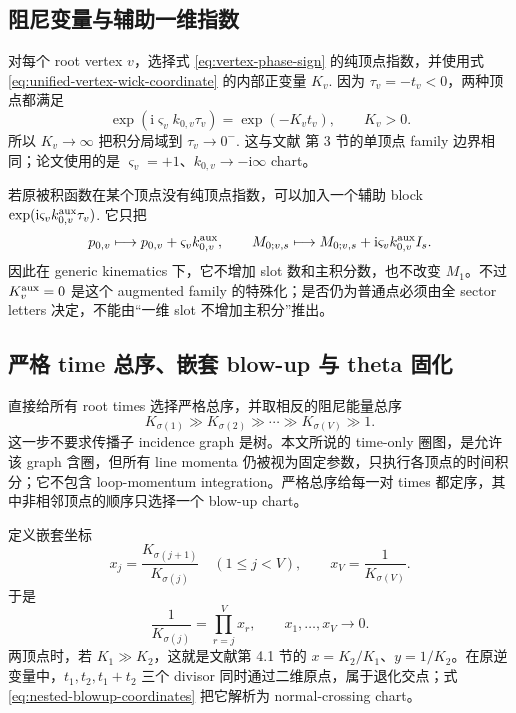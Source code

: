 \documentclass[11pt,a4paper]{ctexart}
\newcommand{\ii}{\mathrm i}
\begin{document}
\subsection{阻尼变量与辅助一维指数}

对每个 root vertex $v$，选择式 \eqref{eq:vertex-phase-sign} 的纯顶点指数，并使用式 \eqref{eq:unified-vertex-wick-coordinate} 的内部正变量 $K_v$. 因为 $\tau_v=-t_v<0$，两种顶点都满足
\begin{equation}
 \exp(\ii\varsigma_vk_{0,v}\tau_v)=\exp(-K_vt_v),
 \qquad K_v>0.
 \label{eq:wick-damping-energy}
\end{equation}
所以 $K_v\to\infty$ 把积分局域到 $\tau_v\to0^-$. 这与文献 \cite{Chen:2024jms} 第 3 节的单顶点 family 边界相同；论文使用的是 $\varsigma_v=+1$、$k_{0,v}\to-\ii\infty$ chart。

若原被积函数在某个顶点没有纯顶点指数，可以加入一个辅助 block $\exp(\ii\varsigma_vk_{0,v}^{\rm aux}\tau_v)$. 它只把
\begin{equation}
 p_{0,v}\longmapsto p_{0,v}+\varsigma_vk_{0,v}^{\rm aux},
 \qquad
 M_{0;v,s}\longmapsto M_{0;v,s}
 +\ii\varsigma_vk_{0,v}^{\rm aux}I_s .
 \label{eq:auxiliary-energy-M0-shift}
\end{equation}
因此在 generic kinematics 下，它不增加 slot 数和主积分数，也不改变 $M_1$。不过 $K_v^{\rm aux}=0$ 是这个 augmented family 的特殊化；是否仍为普通点必须由全 sector letters 决定，不能由“一维 slot 不增加主积分”推出。

\subsection{严格 time 总序、嵌套 blow-up 与 theta 固化}

直接给所有 root times 选择严格总序，并取相反的阻尼能量总序
\begin{equation}
 K_{\sigma(1)}\gg K_{\sigma(2)}\gg\cdots
 \gg K_{\sigma(V)}\gg1.
 \label{eq:strict-energy-rank}
\end{equation}
这一步不要求传播子 incidence graph 是树。本文所说的 time-only 圈图，是允许该 graph 含圈，但所有 line momenta 仍被视为固定参数，只执行各顶点的时间积分；它不包含 loop-momentum integration。严格总序给每一对 times 都定序，其中非相邻顶点的顺序只选择一个 blow-up chart。

定义嵌套坐标
\begin{equation}
 x_j=\frac{K_{\sigma(j+1)}}{K_{\sigma(j)}}
 \quad(1\leq j<V),
 \qquad
 x_V=\frac{1}{K_{\sigma(V)}}.
 \label{eq:nested-blowup-coordinates}
\end{equation}
于是
\begin{equation}
 \frac{1}{K_{\sigma(j)}}=\prod_{r=j}^{V}x_r,
 \qquad x_1,\ldots,x_V\longrightarrow0.
 \label{eq:nested-energy-inverse}
\end{equation}
两顶点时，若 $K_1\gg K_2$，这就是文献第 4.1 节的 $x=K_2/K_1$、$y=1/K_2$。在原逆变量中，$t_1,t_2,t_1+t_2$ 三个 divisor 同时通过二维原点，属于退化交点；式 \eqref{eq:nested-blowup-coordinates} 把它解析为 normal-crossing chart。
\end{document}
